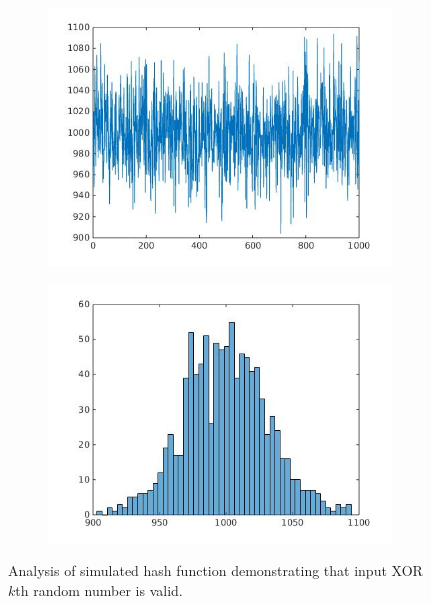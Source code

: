 \documentclass[]{article}
\begin{document}
\begin{figure}[H]
\begin{subfigure}{.235\textwidth}
      \centering
      \includegraphics[width=1\linewidth]{noise2.jpg}
      \vspace{-6mm}
      \caption{}
    \end{subfigure}
    \begin{subfigure}{.235\textwidth}
      \centering
      \includegraphics[width=1\linewidth]{noisehist2.jpg}
      \vspace{-6mm}
      \caption{}
    \end{subfigure}
    \vspace{-2mm}
    \caption{Analysis of simulated hash function demonstrating that input XOR $k$th random number is valid.}
  \end{figure}
\end{document}

